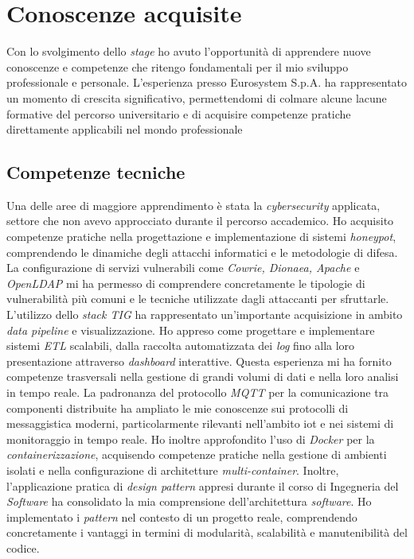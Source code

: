 \section{Conoscenze acquisite}
Con lo svolgimento dello \textit{stage} ho avuto l'opportunità di apprendere nuove conoscenze e competenze che ritengo fondamentali per il mio sviluppo professionale e personale.
L'esperienza presso Eurosystem S.p.A. ha rappresentato un momento di crescita significativo, permettendomi di colmare alcune lacune formative del percorso universitario e di acquisire competenze pratiche direttamente applicabili nel mondo professionale
\subsection*{Competenze tecniche}
Una delle aree di maggiore apprendimento è stata la \textit{cybersecurity} applicata, settore che non avevo approcciato durante il percorso accademico. Ho acquisito competenze pratiche nella progettazione e implementazione di sistemi \textit{honeypot}, comprendendo le dinamiche degli attacchi informatici e le metodologie di difesa. La configurazione di servizi vulnerabili come\textit{ Cowrie, Dionaea, Apache} e \textit{OpenLDAP} mi ha permesso di comprendere concretamente le tipologie di vulnerabilità più comuni e le tecniche utilizzate dagli attaccanti per sfruttarle.
L'utilizzo dello \textit{stack TIG} ha rappresentato un'importante acquisizione in ambito \textit{data pipeline} e visualizzazione. Ho appreso come progettare e implementare sistemi \textit{ETL} scalabili, dalla raccolta automatizzata dei \textit{log} fino alla loro presentazione attraverso \textit{dashboard} interattive. Questa esperienza mi ha fornito competenze trasversali nella gestione di grandi volumi di dati e nella loro analisi in tempo reale.
La padronanza del protocollo \textit{MQTT} per la comunicazione tra componenti distribuite ha ampliato le mie conoscenze sui protocolli di messaggistica moderni, particolarmente rilevanti nell'ambito \gls{iot} e nei sistemi di monitoraggio in tempo reale. Ho inoltre approfondito l'uso di \textit{Docker} per la \textit{containerizzazione}, acquisendo competenze pratiche nella gestione di ambienti isolati e nella configurazione di architetture \textit{multi-container}.
Inoltre, l'applicazione pratica di \textit{design pattern} appresi durante il corso di Ingegneria del \textit{Software} ha consolidato la mia comprensione dell'architettura \textit{software}.
Ho implementato i \textit{pattern} nel contesto di un progetto reale, comprendendo concretamente i vantaggi in termini di modularità, scalabilità e manutenibilità del codice.
